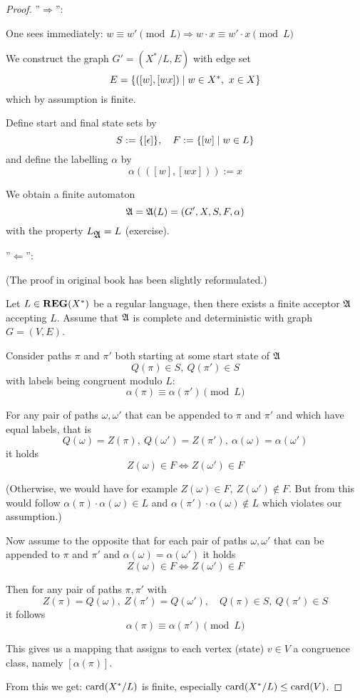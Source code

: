 \begin{proof}\leavevmode

''$\Rightarrow$'':

One sees immediately: $w \equiv w' \pmod{L} \Rightarrow w \cdot x \equiv w'
\cdot x \pmod{L}$

We construct the graph $G' = (X^*/L, E)$ with edge set
\[ E = \mbox{$\{([w], [wx]) \mid w \in X^*,\ x \in X\}$} \]
which by assumption is finite.

Define start and final state sets by
\[ S := \mbox{$\{[\epsilon]\}$},\quad F := \mbox{$\{[w] \mid w\in L\}$} \]
and define the labelling $\alpha$ by
\[ \alpha(([w], [wx])) := x \]

We obtain a finite automaton
\[ \mbox{$\mathfrak{A}$} = \mbox{$\mathfrak{A}$}(L) = (G', X, S, F, \alpha) \]
with the property $L_{\mbox{$\mathfrak{A}$}} = L$ (exercise).

''$\Leftarrow$'':

(The proof in original book has been slightly reformulated.)

Let $L \in \mbox{{\bf REG}}(X^*)$ be a regular language, then there exists a finite acceptor
$\mbox{$\mathfrak{A}$}$ accepting $L$. Assume that $\mbox{$\mathfrak{A}$}$ is complete and deterministic with
graph $G = (V, E)$.

Consider paths $\pi$ and $\pi'$ both starting at some start state of $\mbox{$\mathfrak{A}$}$
\[ Q(\pi) \in S,\ Q(\pi')\in S \]
with labels being congruent modulo $L$:
\[ \alpha(\pi) \equiv \alpha(\pi') \pmod{L} \]

For any pair of paths $\omega, \omega'$ that can be appended to $\pi$ and $\pi'$
and which have equal labels, that is
\[ Q(\omega) = Z(\pi),\ Q(\omega') = Z(\pi'),\ \alpha(\omega) = \alpha(\omega')
\] 
it holds 
\[ Z(\omega) \in F \iff Z(\omega') \in F \]

(Otherwise, we would have for example $Z(\omega) \in F,\ Z(\omega') \notin F$.
But from this would follow $\alpha(\pi) \cdot \alpha(\omega) \in L$ and
$\alpha(\pi') \cdot \alpha(\omega) \notin L$ which violates our assumption.)

Now assume to the opposite that for each pair of paths $\omega,
\omega'$ that can be appended to $\pi$ and $\pi'$ and $\alpha(\omega) =
\alpha(\omega')$ it holds \[ Z(\omega) \in F \iff Z(\omega') \in F \]

Then for any pair of paths $\pi, \pi'$ with 
\[Z(\pi) = Q(\omega),\ Z(\pi') = Q(\omega'),\quad Q(\pi)\in S,\ Q(\pi') \in S \]
it follows 
\[ \alpha(\pi) \equiv \alpha(\pi') \pmod{L} \]

This gives us a mapping that assigns to each vertex (state) $v \in V$ a
congruence class, namely $[\alpha(\pi)]$.

From this we get: $\mathrm{card}({X^*/L})$ is finite, especially $\mathrm{card}({X^*/L}) \leq
\mathrm{card}({V})$.
\end{proof}

